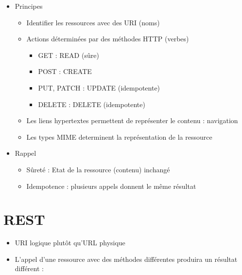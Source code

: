 \begin{itemize}
\tightlist
\item
  Principes

  \begin{itemize}
  \tightlist
  \item
    Identifier les ressources avec des URI (noms)
  \item
    Actions déterminées par des méthodes HTTP (verbes)

    \begin{itemize}
    \tightlist
    \item
      GET : READ (sûre)
    \item
      POST : CREATE
    \item
      PUT, PATCH : UPDATE (idempotente)
    \item
      DELETE : DELETE (idempotente)
    \end{itemize}
  \item
    Les liens hypertextes permettent de représenter le contenu :
    navigation
  \item
    Les types MIME determinent la représentation de la ressource
  \end{itemize}
\item
  Rappel

  \begin{itemize}
  \tightlist
  \item
    Sûreté : Etat de la ressource (contenu) inchangé
  \item
    Idempotence : plusieurs appels donnent le même résultat
  \end{itemize}
\end{itemize}

\hypertarget{rest-1}{%
\section{REST}\label{rest-1}}

\begin{itemize}
\tightlist
\item
  URI logique plutôt qu'URL physique
\item
  L'appel d'une ressource avec des méthodes différentes produira un
  résultat différent :
\end{itemize}

\begin{otherlanguage}{english}

\begin{Shaded}
\begin{Highlighting}[]
\end{Highlighting}
\end{Shaded}

\end{otherlanguage}

